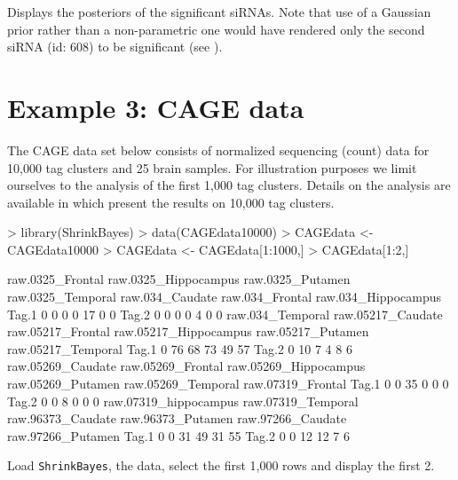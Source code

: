 \documentclass[11pt]{article}
\begin{document}
\noindent Displays the posteriors of the significant siRNAs.
Note that use of a Gaussian prior rather than a non-parametric
one would have rendered only the second siRNA (id: 608) to be
significant (see \cite[]{WielHTRNAi}).


\section{Example 3: CAGE data}\label{cage}
The CAGE data set below consists of normalized sequencing (count) data for 10,000 tag clusters and 25 brain samples.
For illustration purposes we limit ourselves to the analysis of the first 1,000 tag clusters. Details on the analysis
are available in \cite{WielShrinkSeq} which present the results on 10,000 tag clusters.

\begin{Schunk}
\begin{Sinput}
> library(ShrinkBayes)
> data(CAGEdata10000)
> CAGEdata <- CAGEdata10000
> CAGEdata <- CAGEdata[1:1000,]
> CAGEdata[1:2,]
\end{Sinput}
\begin{Soutput}
      raw.0325_Frontal raw.0325_Hippocampus raw.0325_Putamen raw.0325_Temporal raw.034_Caudate raw.034_Frontal raw.034_Hippocampus
Tag.1                0                    0                0                 0              17               0                   0
Tag.2                0                    0                0                 0               4               0                   0
      raw.034_Temporal raw.05217_Caudate raw.05217_Frontal raw.05217_Hippocampus raw.05217_Putamen raw.05217_Temporal
Tag.1                0                76                68                    73                49                 57
Tag.2                0                10                 7                     4                 8                  6
      raw.05269_Caudate raw.05269_Frontal raw.05269_Hippocampus raw.05269_Putamen raw.05269_Temporal raw.07319_Frontal
Tag.1                 0                 0                    35                 0                  0                 0
Tag.2                 0                 0                     8                 0                  0                 0
      raw.07319_hippocampus raw.07319_Temporal raw.96373_Caudate raw.96373_Putamen raw.97266_Caudate raw.97266_Putamen
Tag.1                     0                  0                31                49                31                55
Tag.2                     0                  0                12                12                 7                 6
\end{Soutput}
\end{Schunk}
Load {\tt ShrinkBayes}, the data, select the first 1,000 rows and display the first 2.
\end{document}
